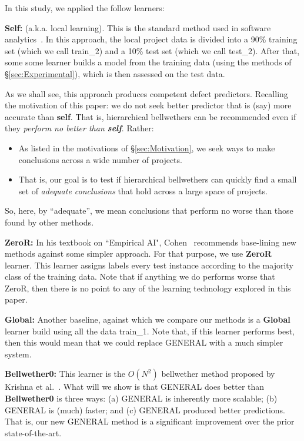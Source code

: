 \documentclass[10pt,journal,compsoc]{IEEEtran}
\newcommand{\bi}{\begin{itemize}}
\newcommand{\ei}{\end{itemize}}
\begin{document}
In this study, we applied the follow learners:

%

\textbf{Self:} (a.k.a. local learning). This  is the standard method used in software analytics~\cite{menzies2013software,zhang2013software}.
In this approach, the local project data is divided into a 90\% training set (which we call  train\_2)
and a 10\% test set (which we call test\_2). After that, some some learner builds a model from the training data
(using the methods of \S\ref{sec:Experimental}),
which is then assessed on the test data.

As we shall see, this approach produces competent defect predictors.
Recalling
the motivation of this paper: we do not
seek   better predictor that is (say) more accurate
than {\bf self}.
That is, hierarchical bellwethers can be recommended even if they {\em 
perform  no better  than {\bf self}}. Rather:
\bi
\item
As listed
in the motivations of
\S\ref{sec:Motivation}, we seek ways to make conclusions
across a wide number of projects. 
\item
That is, our goal is to test if hierarchical bellwethers
can quickly  find a  small set of {\em adequate conclusions}
that hold across a large space 
of projects. 
\ei
So, here, by ``adequate'', we mean conclusions
that perform no worse than those found by other methods.

\textbf{ZeroR:} 
In his textbook on ``Empirical AI", Cohen~\cite{Cohen:1995} recommends base-lining new methods against some simpler approach.
For that purpose, we use {\bf ZeroR} learner. This learner assigns labels every test instance according to
the majority class of the training data. Note that if anything we do performs worse that ZeroR, then there is no
point to any of the learning technology explored in this paper.  

 
\textbf{Global:}  Another baseline, against which we compare our methods
is a {\bf Global} learner build using all the data   train\_1.
Note that, if this learner performs best, then this  would  mean that we could replace GENERAL with a much simpler system.


\textbf{Bellwether0:} This learner is the  $O(N^2)$ bellwether method  proposed by Krishna et al.~\cite{krishna16a}.
What will we show is that GENERAL does better than {\bf Bellwether0} is three ways:
(a) GENERAL is inherently more scalable; (b) GENERAL is (much) faster; and (c) GENERAL produced better predictions.
That is, our new GENERAL method is a significant improvement over the prior state-of-the-art.
\end{document}
